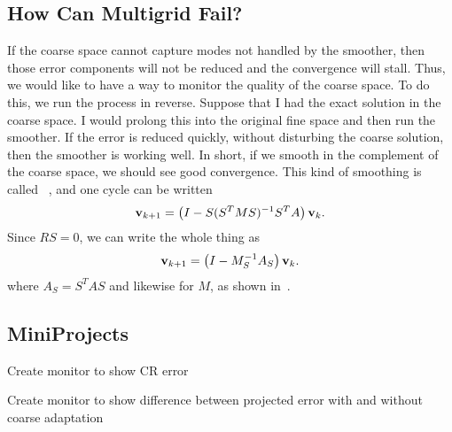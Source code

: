 \begin{refsection}
\chapter{How Can Multigrid Fail?}

If the coarse space cannot capture modes not handled by the smoother, then those error components will not be reduced and the convergence will stall. Thus, we would like to have a way to monitor the quality of the coarse space. To do this, we run the process in reverse. Suppose that I had the exact solution in the coarse space. I would prolong this into the original fine space and then run the smoother. If the error is reduced quickly, without disturbing the coarse solution, then the smoother is working well. In short, if we smooth in the complement of the coarse space, we should see good convergence. This kind of smoothing is called ~\parencite{Brandt2000,BrannickFalgout2007}, and one cycle can be written
\begin{align}
  \vb{v}_{k+1} = \left( I - S (S^T M S)^{-1} S^T A \right) \vb{v}_k.
\end{align}
Since $R S = 0$, we can write the whole thing as
\begin{align}
  \vb{v}_{k+1} = \left( I - M_S^{-1} A_S \right) \vb{v}_k.
\end{align}
where $A_S = S^T A S$ and likewise for $M$, as shown in~\parencite{BrannickEtAl2018}.

\section{MiniProjects}

Create monitor to show CR error

Create monitor to show difference between projected error with and without coarse adaptation

\printbibliography[heading=subbibliography] %
\end{refsection}
